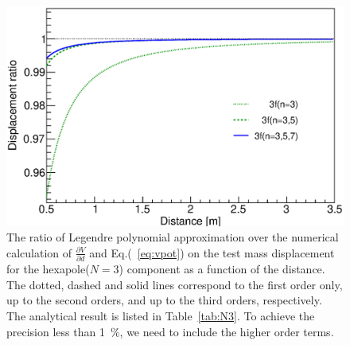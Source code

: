 \documentclass[A4]{spie}  %
\begin{document}
\begin{figure}
\begin{center}
\includegraphics[width=12cm]{3f.eps}
\caption{The ratio of Legendre polynomial approximation over the numerical calculation of $\frac{\partial V}{\partial{d}}$ and Eq.(~\ref{eq:vpot}) 
on the test mass displacement for the hexapole($N=3$) component as a function of the distance. The dotted, dashed and solid lines correspond to the first order only, up to the second orders, and up to the third orders, respectively.
The analytical result is listed in Table~\ref{tab:N3}. To achieve the precision less than 1~\%, we need to include the higher order terms.}
\label{fig:FEM-3f}
\end{center}
\end{figure}
\end{document}
